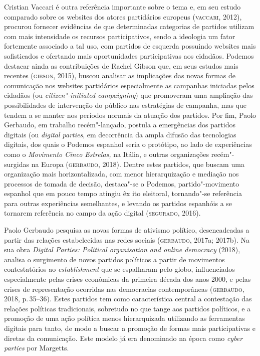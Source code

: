 Cristian Vaccari é outra referência importante sobre o tema e, em seu
estudo comparado sobre os websites dos atores partidários europeus
(\textsc{vaccari}, 2012), procurou fornecer evidências de que determinadas
categorias de partidos utilizam com mais intensidade os recursos
participativos, sendo a ideologia um fator fortemente associado a tal
uso, com partidos de esquerda possuindo websites mais sofisticados e
ofertando mais oportunidades participativas aos cidadãos. Podemos
destacar ainda as contribuições de Rachel Gibson que, em seus estudos
mais recentes (\textsc{gibson}, 2015), buscou analisar as implicações das novas
formas de comunicação nos websites partidários especialmente as
campanhas iniciadas pelos cidadãos (ou \textit{citizen"-initiated campaigning})
que promoveram uma ampliação das possibilidades de intervenção do
público nas estratégias de campanha, mas que tendem a se manter nos
períodos normais da atuação dos partidos. Por fim, Paolo Gerbaudo, em
trabalho recém"-lançado, postula a emergências dos partidos
digitais (ou \textit{digital parties}, em decorrência da ampla difusão das
tecnologias digitais, dos quais o Podemos espanhol seria o
protótipo, ao lado de experiências como o \emph{Movimento Cinco
Estrelas,} na Itália, e outras organizações recém"-surgidas na Europa
(\textsc{gerbaudo}, 2018). Dentre estes partidos, que buscam uma organização mais
horizontalizada, com menor hierarquização e mediação nos processos de
tomada de decisão, destaca"-se o Podemos, partido"-movimento espanhol que
em pouco tempo atingiu êx ito eleitoral, tornando"-se referência para
outras experiências semelhantes, e levando os partidos espanhóis a se
tornarem referência no campo da ação digital (\textsc{segurado}, 2016).

Paolo Gerbaudo pesquisa as novas formas de ativismo político,
desencadeadas a partir das relações estabelecidas nas redes sociais
(\textsc{gerbaudo}, 2017a; 2017b). Na sua obra \emph{Digital Parties: Political
organisation and online democracy} (2018), analisa o surgimento de novos
partidos políticos a partir de movimentos contestatórios ao
\emph{establishment} que se espalharam pelo globo, influenciados
especialmente pelas crises econômicas da primeira década dos anos 2000,
e pelas crises de representação ocorridas nas democracias contemporâneas
(\textsc{gerbaudo}, 2018, p.\,35--36). Estes partidos tem como característica
central a contestação das relações políticas tradicionais, sobretudo no
que tange aos partidos políticos, e a promoção de uma ação política
menos hierarquizada utilizando as ferramentas digitais para tanto, de
modo a buscar a promoção de formas mais participativas e diretas da
comunicação. Este modelo já era denominado na época como \emph{cyber
parties} por Margetts.

